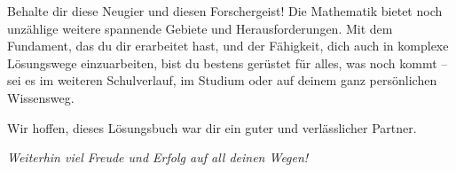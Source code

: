 Behalte dir diese Neugier und diesen Forschergeist! Die Mathematik bietet noch unzählige weitere spannende Gebiete und Herausforderungen. Mit dem Fundament, das du dir erarbeitet hast, und der Fähigkeit, dich auch in komplexe Lösungswege einzuarbeiten, bist du bestens gerüstet für alles, was noch kommt – sei es im weiteren Schulverlauf, im Studium oder auf deinem ganz persönlichen Wissensweg.

Wir hoffen, dieses Lösungsbuch war dir ein guter und verlässlicher Partner.

\vspace{1em}
\begin{center}
    \Large\itshape Weiterhin viel Freude und Erfolg auf all deinen Wegen!
\end{center}
\vspace{2em}

